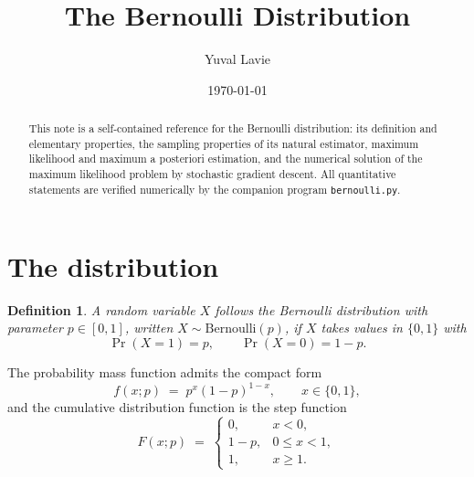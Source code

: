 \documentclass[11pt]{article}
\title{The Bernoulli Distribution}
\author{Yuval Lavie}
\date{\today}
\newtheorem{definition}{Definition}
\theoremstyle{remark}
\begin{document}
\maketitle

\begin{abstract}
This note is a self-contained reference for the Bernoulli
distribution: its definition and elementary properties, the sampling
properties of its natural estimator, maximum likelihood and maximum a
posteriori estimation, and the numerical solution of the maximum
likelihood problem by stochastic gradient descent. All quantitative
statements are verified numerically by the companion program
\texttt{bernoulli.py}.
\end{abstract}

\section{The distribution}

\begin{definition}
A random variable $X$ follows the \emph{Bernoulli distribution} with
parameter $p \in [0,1]$, written $X \sim \mathrm{Bernoulli}(p)$, if
$X$ takes values in $\{0, 1\}$ with
\begin{equation}
  \Pr(X = 1) = p, \qquad \Pr(X = 0) = 1 - p.
\end{equation}
\end{definition}

The probability mass function admits the compact form
\begin{equation}
  f(x; p) \;=\; p^{x}(1-p)^{1-x}, \qquad x \in \{0, 1\},
  \label{eq:pmf}
\end{equation}
and the cumulative distribution function is the step function
\begin{equation}
  F(x; p) \;=\;
  \begin{cases}
    0, & x < 0,\\
    1 - p, & 0 \le x < 1,\\
    1, & x \ge 1.
  \end{cases}
  \label{eq:cdf}
\end{equation}
\end{document}
